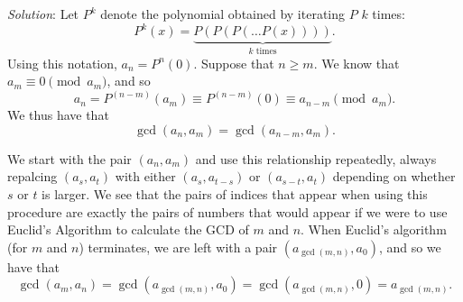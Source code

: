 \documentclass{article}
\begin{document}
\begin{enumerate}
\textit{Solution}:
Let $P^k$ denote the polynomial obtained by iterating $P$ $k$ times: 
\[
	P^k(x) = \underbrace{P(P(P( \dots P(x))))}_{k \text{ times}}.
\]
Using this notation, $a_n = P^n (0)$.
Suppose that $n \geq m$. We know that $a_m \equiv 0 \pmod{a_m}$, and so
\[
	a_n = P^{(n - m)} (a_m) \equiv P^{(n - m)} (0) \equiv a_{n - m} \pmod{a_m}.
\]
We thus have that
\[
	\gcd(a_n, a_m) = \gcd(a_{n - m}, a_m).
\]

We start with the pair $(a_n, a_m)$ and use this relationship repeatedly, always repalcing $(a_s, a_t)$ with either $(a_s, a_{t - s})$ or $(a_{s - t}, a_t)$ depending on whether $s$ or $t$ is larger. We see that the pairs of indices that appear when using this procedure are exactly the pairs of numbers that would appear if we were to use Euclid's Algorithm to calculate the GCD of $m$ and $n$. When Euclid's algorithm (for $m$ and $n$) terminates, we are left with a pair $(a_{\gcd(m, n)}, a_0)$, and so we have that
\[
	\gcd(a_m, a_n) = \gcd(a_{\gcd(m, n)}, a_0) = \gcd(a_{\gcd(m, n)}, 0) = a_{\gcd(m, n)}.
\]


\end{enumerate}
\end{document}
